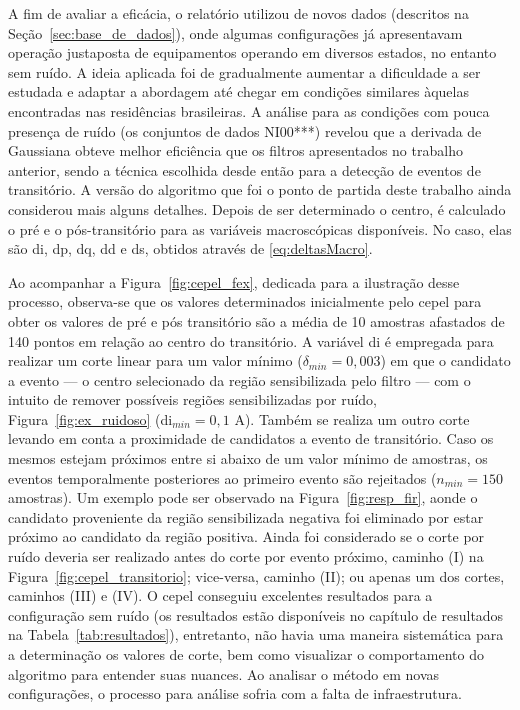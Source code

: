 A fim de avaliar a eficácia, o relatório utilizou de novos dados
(descritos na Seção~\ref{sec:base_de_dados}), onde
algumas configurações já apresentavam operação justaposta de equipamentos
operando em diversos estados, no entanto sem ruído. A ideia aplicada
foi de gradualmente aumentar a dificuldade a ser estudada e adaptar a
abordagem até chegar em condições similares àquelas encontradas nas
residências brasileiras. A análise para as condições com pouca
presença de ruído (os conjuntos de dados NI00***) revelou
que a derivada de Gaussiana obteve melhor eficiência que os filtros
apresentados no trabalho anterior, sendo a técnica escolhida desde
então para a detecção de eventos de transitório.  A versão do
algoritmo que foi o ponto de partida deste trabalho ainda considerou
mais alguns detalhes. Depois de ser determinado o centro, é calculado
o pré e o pós-transitório para as variáveis macroscópicas disponíveis.
No caso, elas são \acf{di}, \acf{dp}, \acf{dq}, \acf{dd} e \acf{ds},
obtidos através de \ref{eq:deltasMacro}.

Ao acompanhar a Figura~\ref{fig:cepel_fex}, dedicada para a ilustração
desse processo, observa-se que os valores determinados inicialmente
pelo \gls{cepel} para obter os valores de pré e pós transitório são a
média de 10 amostras afastados de 140 pontos em relação ao centro do
transitório. A variável \acs{di} é empregada para realizar um corte
linear para um valor mínimo ($\delta_{min} = 0,003$) em que o
candidato a evento --- o centro selecionado da região sensibilizada
pelo filtro --- com o intuito de remover possíveis regiões
sensibilizadas por ruído, Figura~\ref{fig:ex_ruidoso} (\acs{di}$_{min}
= 0,1$ A). Também se realiza um outro corte levando em conta a
proximidade de candidatos a evento de transitório. Caso os mesmos
estejam próximos entre si abaixo de um valor mínimo de amostras, os
eventos temporalmente posteriores ao primeiro evento são rejeitados
($n_{min} = 150$ amostras). Um exemplo pode ser observado na
Figura~\ref{fig:resp_fir}, aonde o candidato proveniente da região
sensibilizada negativa foi eliminado por estar próximo ao candidato da
região positiva. Ainda foi considerado se o corte por ruído deveria
ser realizado antes do corte por evento próximo, caminho (I) na
Figura~\ref{fig:cepel_transitorio}; vice-versa, caminho (II); ou
apenas um dos cortes, caminhos (III) e (IV). O \gls{cepel} conseguiu
excelentes resultados para a configuração sem ruído (os resultados
estão disponíveis no capítulo de resultados na
Tabela~\ref{tab:resultados}), entretanto, não havia uma maneira
sistemática para a determinação os valores de corte, bem como
visualizar o comportamento do algoritmo para entender suas nuances. Ao
analisar o método em novas configurações, o processo para análise
sofria com a falta de infraestrutura.

